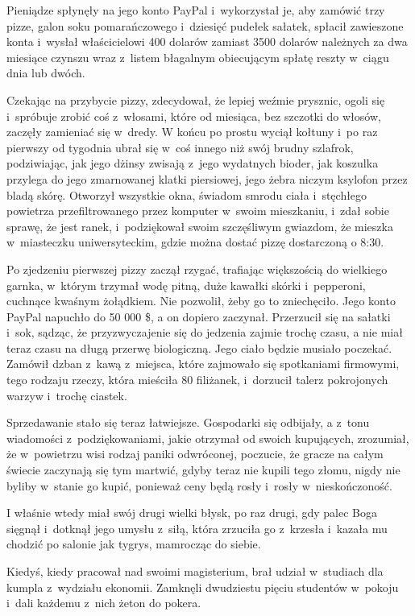 \documentclass[oneside,polish,11pt,rmheadings]{mwbk}
\begin{document}
Pieniądze spłynęły na jego konto PayPal i~wykorzystał je, aby zamówić trzy pizze, galon soku pomarańczowego i~dziesięć pudełek sałatek, spłacił zawieszone konta i~wysłał właścicielowi 400 dolarów zamiast 3500 dolarów należnych za dwa miesiące czynszu wraz z~listem błagalnym obiecującym spłatę reszty w~ciągu dnia lub dwóch.

Czekając na przybycie pizzy, zdecydował, że lepiej weźmie prysznic, ogoli się i~spróbuje zrobić coś z~włosami, które od miesiąca, bez szczotki do włosów, zaczęły zamieniać się w~dredy. W końcu po prostu wyciął kołtuny i~po raz pierwszy od tygodnia ubrał się w~coś innego niż swój brudny szlafrok, podziwiając, jak jego dżinsy zwisają z~jego wydatnych bioder, jak koszulka przylega do jego zmarnowanej klatki piersiowej, jego żebra niczym ksylofon przez bladą skórę. Otworzył wszystkie okna, świadom smrodu ciała i~stęchłego powietrza przefiltrowanego przez komputer w~swoim mieszkaniu, i~zdał sobie sprawę, że jest ranek, i~podziękował swoim szczęśliwym gwiazdom, że mieszka w~miasteczku uniwersyteckim, gdzie można dostać pizzę dostarczoną o 8:30.

Po zjedzeniu pierwszej pizzy zaczął rzygać, trafiając większością do wielkiego garnka, w~którym trzymał wodę pitną, duże kawałki skórki i~pepperoni, cuchnące kwaśnym żołądkiem. Nie pozwolił, żeby go to zniechęciło. Jego konto PayPal napuchło do 50 000 \$, a on dopiero zaczynał. Przerzucił się na sałatki i~sok, sądząc, że przyzwyczajenie się do jedzenia zajmie trochę czasu, a nie miał teraz czasu na długą przerwę biologiczną. Jego ciało będzie musiało poczekać. Zamówił dzban z~kawą z~miejsca, które zajmowało się spotkaniami firmowymi, tego rodzaju rzeczy, która mieściła 80 filiżanek, i~dorzucił talerz pokrojonych warzyw i~trochę ciastek.

Sprzedawanie stało się teraz łatwiejsze. Gospodarki się odbijały, a z~tonu wiadomości z~podziękowaniami, jakie otrzymał od swoich kupujących, zrozumiał, że w~powietrzu wisi rodzaj paniki odwróconej, poczucie, że gracze na całym świecie zaczynają się tym martwić, gdyby teraz nie kupili tego złomu, nigdy nie byliby w~stanie go kupić, ponieważ ceny będą rosły i~rosły w~nieskończoność.

I właśnie wtedy miał swój drugi wielki błysk, po raz drugi, gdy palec Boga sięgnął i~dotknął jego umysłu z~siłą, która zrzuciła go z~krzesła i~kazała mu chodzić po salonie jak tygrys, mamrocząc do siebie.

Kiedyś, kiedy pracował nad swoimi magisterium, brał udział w~studiach dla kumpla z~wydziału ekonomii. Zamknęli dwudziestu pięciu studentów w~pokoju i~dali każdemu z~nich żeton do pokera. 
\end{document}
